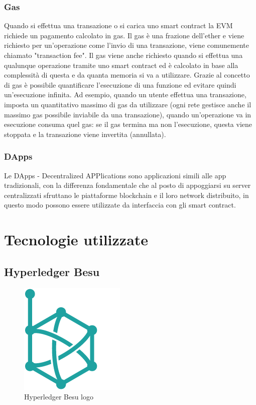 \documentclass[11pt,a4paper,titlepage]{report}
\begin{document}
\subsection{Gas}
Quando si effettua una transazione o si carica uno smart contract la EVM richiede un pagamento calcolato in gas. Il gas è una frazione dell'ether e viene richiesto per un'operazione come l'invio di una transazione, viene comunemente chiamato "transaction fee". Il gas viene anche richiesto quando si effettua una qualunque operazione tramite uno smart contract ed è calcolato in base alla complessità di questa e da quanta memoria si va a utilizzare. Grazie al concetto di gas è possibile quantificare l'esecuzione di una funzione ed evitare quindi un'esecuzione infinita. Ad esempio, quando un utente effettua una transazione, imposta un quantitativo massimo di gas da utilizzare (ogni rete gestisce anche il massimo gas possibile inviabile da una transazione), quando un'operazione va in esecuzione consuma quel gas: se il gas termina ma non l'esecuzione, questa viene stoppata e la transazione viene invertita (annullata).

\subsection{DApps}

Le DApps - Decentralized APPlications sono applicazioni simili alle app tradizionali, con la differenza fondamentale che al posto di appoggiarsi su server centralizzati sfruttano le piattaforme blockchain e il loro network distribuito, in questo modo possono essere utilizzate da interfaccia con gli smart contract.

\chapter{Tecnologie utilizzate}

\section{Hyperledger Besu}
\begin{figure}
	\includegraphics[height=0.2\textheight]{Hyperledger_Besu}
	\centering
	\caption{Hyperledger Besu logo}
	\label{fig:Hyperledger_Besu_logo}
\end{figure}
\end{document}
